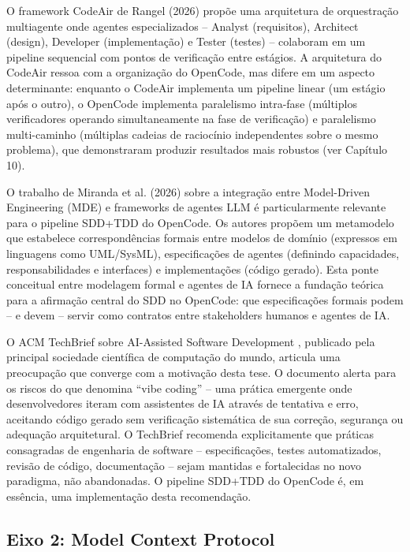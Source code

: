 \documentclass[12pt,a4paper,sumario=tradicional,openany]{abntex2}
\begin{document}
O framework CodeAir de Rangel (2026) \cite{rangel2026codeair} propõe uma arquitetura de orquestração multiagente onde agentes especializados -- Analyst (requisitos), Architect (design), Developer (implementação) e Tester (testes) -- colaboram em um pipeline sequencial com pontos de verificação entre estágios. A arquitetura do CodeAir ressoa com a organização do OpenCode, mas difere em um aspecto determinante: enquanto o CodeAir implementa um pipeline linear (um estágio após o outro), o OpenCode implementa paralelismo intra-fase (múltiplos verificadores operando simultaneamente na fase de verificação) e paralelismo multi-caminho (múltiplas cadeias de raciocínio independentes sobre o mesmo problema), que demonstraram produzir resultados mais robustos (ver Capítulo 10).

O trabalho de Miranda et al. (2026) \cite{miranda2026bridging} sobre a integração entre Model-Driven Engineering (MDE) e frameworks de agentes LLM é particularmente relevante para o pipeline SDD+TDD do OpenCode. Os autores propõem um metamodelo que estabelece correspondências formais entre modelos de domínio (expressos em linguagens como UML/SysML), especificações de agentes (definindo capacidades, responsabilidades e interfaces) e implementações (código gerado). Esta ponte conceitual entre modelagem formal e agentes de IA fornece a fundação teórica para a afirmação central do SDD no OpenCode: que especificações formais podem -- e devem -- servir como contratos entre stakeholders humanos e agentes de IA.

O ACM TechBrief sobre AI-Assisted Software Development \cite{garfinkel2026acm}, publicado pela principal sociedade científica de computação do mundo, articula uma preocupação que converge com a motivação desta tese. O documento alerta para os riscos do que denomina ``vibe coding'' -- uma prática emergente onde desenvolvedores iteram com assistentes de IA através de tentativa e erro, aceitando código gerado sem verificação sistemática de sua correção, segurança ou adequação arquitetural. O TechBrief recomenda explicitamente que práticas consagradas de engenharia de software -- especificações, testes automatizados, revisão de código, documentação -- sejam mantidas e fortalecidas no novo paradigma, não abandonadas. O pipeline SDD+TDD do OpenCode é, em essência, uma implementação desta recomendação.

\subsection{Eixo 2: Model Context Protocol}
\end{document}
